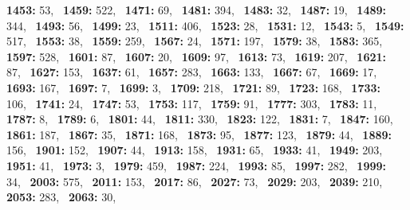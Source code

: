 \textbf{1453:} 53,\allowbreak~ 
\textbf{1459:} 522,\allowbreak~ 
\textbf{1471:} 69,\allowbreak~ 
\textbf{1481:} 394,\allowbreak~ 
\textbf{1483:} 32,\allowbreak~ 
\textbf{1487:} 19,\allowbreak~ 
\textbf{1489:} 344,\allowbreak~ 
\textbf{1493:} 56,\allowbreak~ 
\textbf{1499:} 23,\allowbreak~ 
\textbf{1511:} 406,\allowbreak~ 
\textbf{1523:} 28,\allowbreak~ 
\textbf{1531:} 12,\allowbreak~ 
\textbf{1543:} 5,\allowbreak~ 
\textbf{1549:} 517,\allowbreak~ 
\textbf{1553:} 38,\allowbreak~ 
\textbf{1559:} 259,\allowbreak~ 
\textbf{1567:} 24,\allowbreak~ 
\textbf{1571:} 197,\allowbreak~ 
\textbf{1579:} 38,\allowbreak~ 
\textbf{1583:} 365,\allowbreak~ 
\textbf{1597:} 528,\allowbreak~ 
\textbf{1601:} 87,\allowbreak~ 
\textbf{1607:} 20,\allowbreak~ 
\textbf{1609:} 97,\allowbreak~ 
\textbf{1613:} 73,\allowbreak~ 
\textbf{1619:} 207,\allowbreak~ 
\textbf{1621:} 87,\allowbreak~ 
\textbf{1627:} 153,\allowbreak~ 
\textbf{1637:} 61,\allowbreak~ 
\textbf{1657:} 283,\allowbreak~ 
\textbf{1663:} 133,\allowbreak~ 
\textbf{1667:} 67,\allowbreak~ 
\textbf{1669:} 17,\allowbreak~ 
\textbf{1693:} 167,\allowbreak~ 
\textbf{1697:} 7,\allowbreak~ 
\textbf{1699:} 3,\allowbreak~ 
\textbf{1709:} 218,\allowbreak~ 
\textbf{1721:} 89,\allowbreak~ 
\textbf{1723:} 168,\allowbreak~ 
\textbf{1733:} 106,\allowbreak~ 
\textbf{1741:} 24,\allowbreak~ 
\textbf{1747:} 53,\allowbreak~ 
\textbf{1753:} 117,\allowbreak~ 
\textbf{1759:} 91,\allowbreak~ 
\textbf{1777:} 303,\allowbreak~ 
\textbf{1783:} 11,\allowbreak~ 
\textbf{1787:} 8,\allowbreak~ 
\textbf{1789:} 6,\allowbreak~ 
\textbf{1801:} 44,\allowbreak~ 
\textbf{1811:} 330,\allowbreak~ 
\textbf{1823:} 122,\allowbreak~ 
\textbf{1831:} 7,\allowbreak~ 
\textbf{1847:} 160,\allowbreak~ 
\textbf{1861:} 187,\allowbreak~ 
\textbf{1867:} 35,\allowbreak~ 
\textbf{1871:} 168,\allowbreak~ 
\textbf{1873:} 95,\allowbreak~ 
\textbf{1877:} 123,\allowbreak~ 
\textbf{1879:} 44,\allowbreak~ 
\textbf{1889:} 156,\allowbreak~ 
\textbf{1901:} 152,\allowbreak~ 
\textbf{1907:} 44,\allowbreak~ 
\textbf{1913:} 158,\allowbreak~ 
\textbf{1931:} 65,\allowbreak~ 
\textbf{1933:} 41,\allowbreak~ 
\textbf{1949:} 203,\allowbreak~ 
\textbf{1951:} 41,\allowbreak~ 
\textbf{1973:} 3,\allowbreak~ 
\textbf{1979:} 459,\allowbreak~ 
\textbf{1987:} 224,\allowbreak~ 
\textbf{1993:} 85,\allowbreak~ 
\textbf{1997:} 282,\allowbreak~ 
\textbf{1999:} 34,\allowbreak~ 
\textbf{2003:} 575,\allowbreak~ 
\textbf{2011:} 153,\allowbreak~ 
\textbf{2017:} 86,\allowbreak~ 
\textbf{2027:} 73,\allowbreak~ 
\textbf{2029:} 203,\allowbreak~ 
\textbf{2039:} 210,\allowbreak~ 
\textbf{2053:} 283,\allowbreak~ 
\textbf{2063:} 30,\allowbreak~ 
